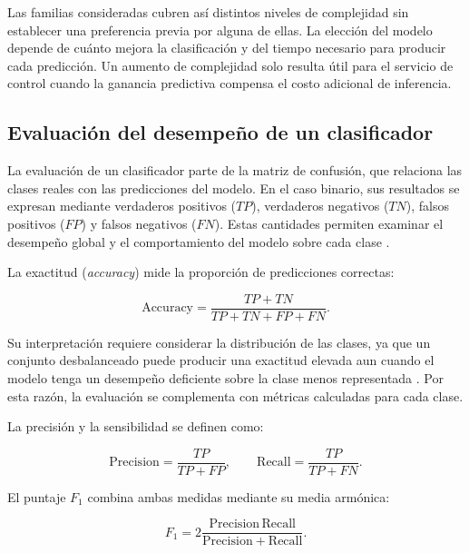 Las familias consideradas cubren así distintos niveles de complejidad sin
establecer una preferencia previa por alguna de ellas. La elección del modelo
depende de cuánto mejora la clasificación y del tiempo necesario para producir
cada predicción. Un aumento de complejidad solo resulta útil para el servicio
de control cuando la ganancia predictiva compensa el costo adicional de
inferencia.

\subsection{Evaluación del desempeño de un clasificador}
\label{sec:marco-evaluacion-clasificador}

La evaluación de un clasificador parte de la matriz de confusión, que
relaciona las clases reales con las predicciones del modelo. En el caso
binario, sus resultados se expresan mediante verdaderos positivos ($TP$),
verdaderos negativos ($TN$), falsos positivos ($FP$) y falsos negativos
($FN$). Estas cantidades permiten examinar el desempeño global y el
comportamiento del modelo sobre cada clase \cite{SokolovaLapalme2009}.

La exactitud (\textit{accuracy}) mide la proporción de predicciones
correctas:

\begin{equation}
    \mathrm{Accuracy}
    =
    \frac{TP+TN}{TP+TN+FP+FN}.
\end{equation}

Su interpretación requiere considerar la distribución de las clases, ya que
un conjunto desbalanceado puede producir una exactitud elevada aun cuando el
modelo tenga un desempeño deficiente sobre la clase menos representada
\cite{Brodersen2010}. Por esta razón, la evaluación se complementa con
métricas calculadas para cada clase.

La precisión y la sensibilidad se definen como:

\begin{equation}
    \mathrm{Precision}
    =
    \frac{TP}{TP+FP},
    \qquad
    \mathrm{Recall}
    =
    \frac{TP}{TP+FN}.
\end{equation}

El puntaje $F_1$ combina ambas medidas mediante su media armónica:

\begin{equation}
    F_1
    =
    2
    \frac{
        \mathrm{Precision}\,\mathrm{Recall}
    }{
        \mathrm{Precision}+\mathrm{Recall}
    }.
\end{equation}


